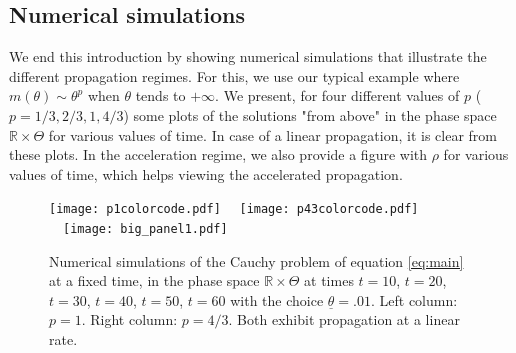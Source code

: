 \documentclass[11pt]{article}    %
\newcommand{\R}{\mathbb{R}}
\begin{document}
\subsection*{Numerical simulations}

We end this introduction by showing numerical simulations that illustrate the different propagation regimes. For this, we use our typical example where $m(\theta) \sim \theta^p$ when $\theta$ tends to $+\infty$.  We present, for four different values of $p$ ($p=1/3, 2/3, 1, 4/3$) some plots of the solutions "from above" in the phase space $\R\times\Theta$ for various values of time. In case of a linear propagation, it is clear from these plots. In the acceleration regime, we also provide a figure with $\rho$ for various values of time, which helps viewing the accelerated propagation. 


\begin{figure}[htbp]
\begin{center}
\texttt{[image: p1colorcode.pdf]}\qquad~~
\texttt{[image: p43colorcode.pdf]}
~~\texttt{[image: big\_panel1.pdf]}\\
\caption{Numerical simulations of the Cauchy problem of equation \eqref{eq:main} at a fixed time, in the phase space $\R\times\Theta$ at times $t=10$, $t=20$, $t=30$, $t=40$, $t=50$, $t=60$ with the choice $\underline \theta = .01$. Left column: $p=1$. Right column: $p=4/3$. Both exhibit propagation at a linear rate.}
\label{fig:Shape}
\end{center}
\end{figure}
\end{document}
